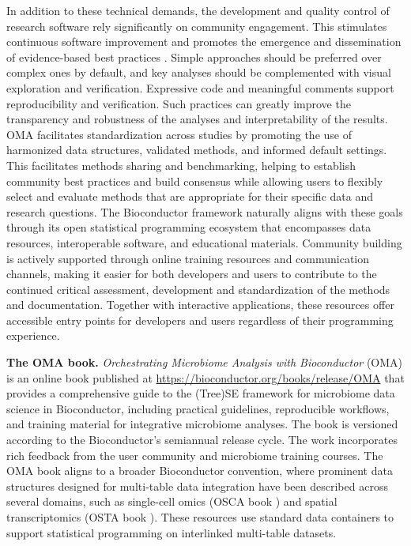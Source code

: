 \documentclass[
  sn-nature,
]{sn-jnl}
\begin{document}
In addition to these technical demands, the development and quality
control of research software rely significantly on community engagement.
This stimulates continuous software improvement and promotes the
emergence and dissemination of evidence-based best practices
\citep{berg2020, barker2022, hocquet2024}. Simple approaches should be
preferred over complex ones by default, and key analyses should be
complemented with visual exploration and verification. Expressive code
and meaningful comments support reproducibility and verification. Such
practices can greatly improve the transparency and robustness of the
analyses and interpretability of the results. OMA facilitates
standardization across studies by promoting the use of harmonized data
structures, validated methods, and informed default settings. This
facilitates methods sharing and benchmarking, helping to establish
community best practices and build consensus while allowing users to
flexibly select and evaluate methods that are appropriate for their
specific data and research questions. The Bioconductor framework
naturally aligns with these goals through its open statistical
programming ecosystem that encompasses data resources, interoperable
software, and educational materials. Community building is actively
supported through online training resources and communication channels,
making it easier for both developers and users to contribute to the
continued critical assessment, development and standardization of the
methods and documentation. Together with interactive applications, these
resources offer accessible entry points for developers and users
regardless of their programming experience.

\textbf{The OMA book.} \emph{Orchestrating Microbiome Analysis with
Bioconductor} (OMA) is an online book published at
\url{https://bioconductor.org/books/release/OMA} that provides a
comprehensive guide to the (Tree)SE framework for microbiome data
science in Bioconductor, including practical guidelines, reproducible
workflows, and training material for integrative microbiome analyses.
The book is versioned according to the Bioconductor's semiannual release
cycle. The work incorporates rich feedback from the user community and
microbiome training courses. The OMA book aligns to a broader
Bioconductor convention, where prominent data structures
\citep{huber2015, ramos2017, huang2021} designed for multi-table data
integration have been described across several domains, such as
single-cell omics (OSCA book \citep{amezquita2020}) and spatial
transcriptomics (OSTA book \citep{crowell2025}). These resources use
standard data containers to support statistical programming on
interlinked multi-table datasets.
\end{document}
